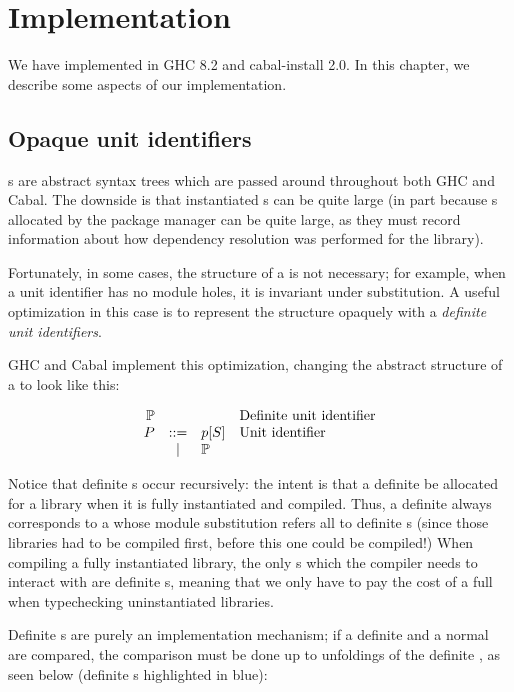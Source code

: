 \chapter{Implementation}
\label{sec:implementation}

We have implemented \Backpack{} in GHC 8.2 and cabal-install 2.0.  In
this chapter, we describe some aspects of our implementation.

\section{Opaque unit identifiers}
\label{sec:opaque-uid}

\Uid{}s are abstract syntax trees which are passed around throughout
both GHC and Cabal.  The downside is that instantiated \uid{}s
can be quite large (in part because \cid{}s allocated by the
package manager can be quite large, as they must record information
about how dependency resolution was performed for the library).

Fortunately, in some cases, the structure of a \uid{} is not necessary;
for example, when a unit identifier has no module holes, it is
invariant under substitution.  A useful optimization in this case
is to represent the structure opaquely with a \emph{definite unit
identifiers}.

GHC and Cabal implement this optimization, changing the
abstract structure of a \uid{} to look like this:

\[
\begin{array}{rcll}
  \mathbb{P} &&& \text{Definite \uid{}} \\
  \UP &::=& \icid{\Up}{S} & \text{\Uid} \\
      & | & \mathbb{P} \\
\end{array}
\]

\noindent
Notice that definite \uid{}s occur recursively: the intent is that a
definite \uid{} be allocated for a library when it is fully instantiated
and compiled.  Thus, a definite \uid{} always corresponds to a \uid{}
whose module substitution refers all to definite \uid{}s (since those
libraries had to be compiled first, before this one could be compiled!)
When compiling a fully instantiated library, the only \uid{}s which the
compiler needs to interact with are definite \uid{}s, meaning that we
only have to pay the cost of a full \uid{} when typechecking uninstantiated
libraries.

Definite \uid{}s are purely an implementation mechanism; if a definite
\uid{} and a normal \uid{} are compared, the comparison must be done
up to unfoldings of the definite \uid{}, as seen below (definite \uid{}s
highlighted in blue):

